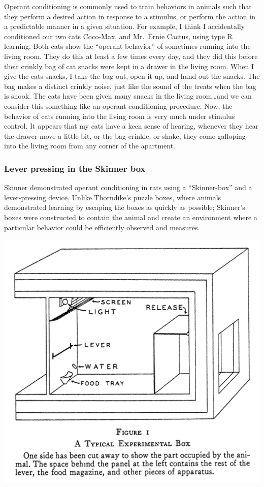 \documentclass[
  oneside,
  12pt]{crumpbook}
\newenvironment{floatright50}{%
  \wrapfigure{R}{.5\textwidth}%
  }{%
  \endwrapfigure}
\begin{document}
Operant conditioning is commonly used to train behaviors in animals such that they perform a desired action in response to a stimulus, or perform the action in a predictable manner in a given situation. For example, I think I accidentally conditioned our two cats Coco-Max, and Mr.~Ernie Cactus, using type R learning. Both cats show the ``operant behavior'' of sometimes running into the living room. They do this at least a few times every day, and they did this before their crinkly bag of cat snacks were kept in a drawer in the living room. When I give the cats snacks, I take the bag out, open it up, and hand out the snacks. The bag makes a distinct crinkly noise, just like the sound of the treats when the bag is shook. The cats have been given many snacks in the living room\ldots and we can consider this something like an operant conditioning procedure. Now, the behavior of cats running into the living room is very much under stimulus control. It appears that my cats have a keen sense of hearing, whenever they hear the drawer move a little bit, or the bag crinkle, or shake, they come galloping into the living room from any corner of the apartment.

\hypertarget{lever-pressing-in-the-skinner-box}{%
\subsubsection{Lever pressing in the Skinner box}\label{lever-pressing-in-the-skinner-box}}

Skinner demonstrated operant conditioning in rats using a ``Skinner-box'' and a lever-pressing device. Unlike Thorndike's puzzle boxes, where animals demonstrated learning by escaping the boxes as quickly as possible; Skinner's boxes were constructed to contain the animal and create an environment where a particular behavior could be efficiently observed and measures.

\begin{floatright50}
\includegraphics[width=1\linewidth]{imgs/Skinner_Box}

\end{floatright50}
\end{document}
